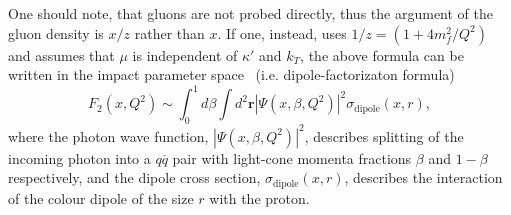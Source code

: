 \documentclass[12pt]{article}
\numberwithin{equation}{section}
\numberwithin{table}{section}
\numberwithin{figure}{section}
\begin{document}
One should note, that gluons are not probed directly, thus the argument of the gluon density is $x/z$ rather than $x$.
If one, instead, uses $ 1/z=\left(1+4 m_f^2/Q^2\right)$ and assumes that $\mu$ is independent of $\kappa'$ and $k_T$, 
the above formula can be written in the impact parameter space~\cite{Golec-Biernat:1998zce,Nikolaev:1990ja} (i.e. dipole-factorizaton formula)
\begin{equation}
F_2\left(x,Q^2\right)\sim\int^1_0d\beta \int d^2\mathbf{r}\left|\Psi\left(x,\beta,Q^2\right)\right|^2\sigma_{\mathrm{dipole}}\left(x,r\right),
\label{eq:dipole-factorization}
\end{equation}
where the photon wave function, $\left|\Psi\left(x,\beta,Q^2\right)\right|^2$, describes splitting of the incoming photon into a $q\overline{q}$ pair with light-cone momenta fractions $\beta$ and $1-\beta$ respectively, and the dipole cross section, $\sigma_{\mathrm{dipole}}\left(x,r\right)$, describes the interaction of the colour dipole of the size $r$ with the proton.\\
\end{document}
